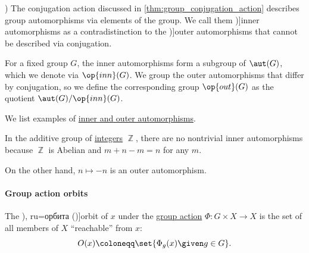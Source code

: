 \begin{definition}\label{def:inner_and_outer_automorphisms})
  The conjugation action discussed in \cref{thm:group_conjugation_action} describes group automorphisms via elements of the group. We call them \term[ru=внутренний автоморфизм (\cite[78]{Курош1967ТеорияГрупп})]{inner automorphisms} as a contradistinction to the \term[ru=внешний автоморфизм (\cite[78]{Курош1967ТеорияГрупп})]{outer automorphisms} that cannot be described via conjugation.

  For a fixed group \( G \), the inner automorphisms form a subgroup of \( \aut(G) \), which we denote via \( \op{inn}(G) \). We group the outer automorphisms that differ by conjugation, so we define the corresponding group \( \op{out}(G) \) as the quotient \( \aut(G) / \op{inn}(G) \).
\end{definition}

\begin{example}\label{ex:def:inner_and_outer_automorphisms}
  We list examples of \hyperref[def:inner_and_outer_automorphisms]{inner and outer automorphisms}.
  \begin{thmenum}
     In the additive group of \hyperref[def:integers]{integers} \( \BbbZ \), there are no nontrivial inner automorphisms because \( \BbbZ \) is Abelian and \( m + n - m = n \) for any \( m \).

    On the other hand, \( n \mapsto -n \) is an outer automorphism.
  \end{thmenum}
\end{example}

\paragraph{Group action orbits}

\begin{definition}\label{def:group_action_orbit}
  The \term[bg=орбита (\cite[def. IV.20]{ГеновМиховскиМоллов1991Алгебра}), ru=орбита (\cite[179]{Винберг2014КурсАлгебры})]{orbit} of \( x \) under the \hyperref[def:group_action]{group action} \( \Phi: G \times X \to X \) is the set of all members of \( X \) \enquote{reachable} from \( x \):
  \begin{equation*}
    O(x) \coloneqq \set{ \Phi_g(x) \given g \in G }.
  \end{equation*}
\end{definition}

